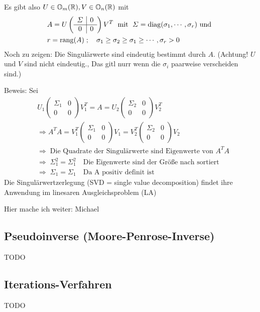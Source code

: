 Es gibt also $U \in \mathbb O_m(\mathbb R), V \in \mathbb O_n(\mathbb R)$ mit
\begin{align*}
  & A = U \left(\begin{array}{c|c} \varSigma & 0  \\ \hline 0 & 0 \end{array} \right) V^T \; \text{ mit } \; \varSigma = \operatorname*{\mathrm{diag}}(\sigma_1, \cdots , \sigma_r) \text{ und }\\
  & r = \operatorname*{\mathrm{rang}}(A) \; ; \quad \sigma_1\ge \sigma_2\ge\sigma_1\ge  \cdots , \sigma_r > 0
\end{align*}
Noch zu zeigen: Die Singulärwerte sind eindeutig bestimmt durch $A$.
(Achtung! $U$ und $V$ sind nicht eindeutig., Das gitl nurr wenn die $\sigma_i$
paarweise verscheiden sind.)

Beweis: Sei
\begin{align*}
  & U_1 \left(\begin{array}{c|c} \varSigma_1 & 0  \\ \hline 0 & 0 \end{array} \right) V_1^T =
A = U_2 \left(\begin{array}{c|c} \varSigma_2 & 0  \\ \hline 0 & 0 \end{array} \right) V_2^T \\
& \Rightarrow A^T A = V_1^T \left(\begin{array}{c|c} \varSigma_1 & 0  \\ \hline 0 & 0 \end{array} \right) V_1 = V_2^T \left(\begin{array}{c|c} \varSigma_2 & 0  \\ \hline 0 & 0 \end{array} \right) V_2 \\
& \Rightarrow \; \text{Die Quadrate der Singulärwerte sind Eigenwerte von } A^T A\\
& \Rightarrow \; \varSigma_1^2 = \varSigma_1^2  \quad \text{Die Eigenwerte sind der Größe nach sortiert}\\
& \Rightarrow \;  \varSigma_1 = \varSigma_1 \quad \text{Da A positiv definit ist}
\end{align*}
Die Singulärwertzerlegung (SVD = single value decomposition) findet ihre Anwendung im
linesaren Ausgleichsproblem (LA)


Hier mache ich weiter: Michael

\subsection{Pseudoinverse (Moore-Penrose-Inverse)}

TODO

\subsection{Iterations-Verfahren}


TODO

